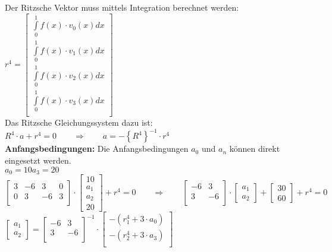 Der Ritzsche Vektor muss mittels Integration berechnet werden:\\

$r^4=
	\begin{bmatrix}
		\int\limits_{0}^{1}{f(x)\cdot v_0(x)dx} \\
		\int\limits_{0}^{1}{f(x)\cdot v_1(x)dx} \\
		\int\limits_{0}^{1}{f(x)\cdot v_2(x)dx} \\
		\int\limits_{0}^{1}{f(x)\cdot v_3(x)dx} \\
	\end{bmatrix}$\\

Das Ritzsche Gleichungssystem dazu ist: $\boxed{R^4\cdot a+r^4=0} \qquad\Rightarrow\qquad a=-\left\{R^4\right\}^{-1}\cdot r^4$\\

\textbf{Anfangsbedingungen:} Die Anfangsbedingungen $a_0$ und $a_n$ können direkt eingesetzt werden.\\

$a_0=10$\qquad$a_3=20$\\

$
	\begin{bmatrix}
		3 & -6 & 3  & 0 \\
		0 & 3  & -6 & 3 \\
	\end{bmatrix}\cdot
	\begin{bmatrix}
		10 \\a_1\\a_2\\20
	\end{bmatrix}+r^4=0\qquad\Rightarrow\qquad
	\begin{bmatrix}
		-6 & 3  \\
		3  & -6 \\
	\end{bmatrix}\cdot
	\begin{bmatrix}
		a_1 \\a_2
	\end{bmatrix}+
	\begin{bmatrix}
		30 \\60
	\end{bmatrix}+
	r^4=0
$\\

$
	\begin{bmatrix}
		a_1 \\a_2
	\end{bmatrix}=
	\begin{bmatrix}
		-6 & 3  \\
		3  & -6 \\
	\end{bmatrix}^{-1}\cdot
	\begin{bmatrix}
		-\left(r^4_1+3\cdot a_0\right) \\
		-\left(r^4_2+3\cdot a_3\right) \\
	\end{bmatrix}
$


